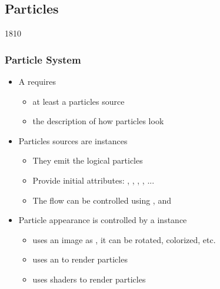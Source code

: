 %
%
%
%

\subsection{Particles}


\begin{slide}{1810}\frametitle{Particle System}

\begin{itemize}
\item A  requires
  \begin{itemize}
  \item at least a particles source
  \item the description of how particles look
  \end{itemize}
\vspace*{0.5em}
\item Particles sources are  instances
  \begin{itemize}
  \item They emit the logical particles
  \item Provide initial attributes: , , , , ...
  \item The flow can be controlled using ,  and 
  \end{itemize}
\vspace*{0.5em}
\item Particle appearance is controlled by a  instance
  \begin{itemize}
  \item {} uses an image as , it can be rotated, colorized, etc.
  \item {} uses an   to render particles
  \item {} uses shaders to render particles
  \end{itemize}
\end{itemize}

\end{slide}

